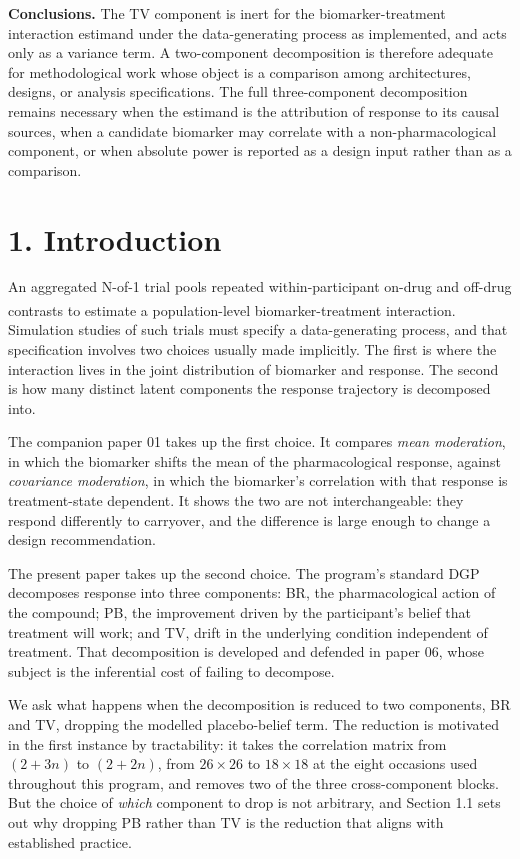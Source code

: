 \documentclass[
  11pt,
]{article}
\begin{document}
\textbf{Conclusions.} The TV component is inert for the
biomarker-treatment interaction estimand under the data-generating
process as implemented, and acts only as a variance term. A
two-component decomposition is therefore adequate for methodological
work whose object is a comparison among architectures, designs, or
analysis specifications. The full three-component decomposition
remains necessary when the estimand is the attribution of response to
its causal sources, when a candidate biomarker may correlate with a
non-pharmacological component, or when absolute power is reported as
a design input rather than as a comparison.

\section{1. Introduction}

An aggregated N-of-1 trial pools repeated within-participant on-drug
and off-drug contrasts to estimate a population-level
biomarker-treatment interaction\textsuperscript{}. Simulation
studies of such trials must specify a data-generating process, and
that specification involves two choices usually made implicitly. The
first is where the interaction lives in the joint distribution of
biomarker and response. The second is how many distinct latent
components the response trajectory is decomposed into.

The companion paper 01 takes up the first choice. It compares
\emph{mean moderation}, in which the biomarker shifts the mean of the
pharmacological response, against \emph{covariance moderation}, in
which the biomarker's correlation with that response is
treatment-state dependent. It shows the two are not interchangeable:
they respond differently to carryover, and the difference is large
enough to change a design recommendation.

The present paper takes up the second choice. The program's standard
DGP decomposes response into three components: BR, the
pharmacological action of the compound; PB, the improvement driven by
the participant's belief that treatment will work; and TV, drift in
the underlying condition independent of treatment. That decomposition
is developed and defended in paper 06, whose subject is the
inferential cost of failing to decompose.

We ask what happens when the decomposition is reduced to two
components, BR and TV, dropping the modelled placebo-belief term. The
reduction is motivated in the first instance by tractability: it
takes the correlation matrix from \((2 + 3n)\) to \((2 + 2n)\), from \(26
\times 26\) to \(18 \times 18\) at the eight occasions used throughout
this program, and removes two of the three cross-component blocks.
But the choice of \emph{which} component to drop is not arbitrary,
and Section 1.1 sets out why dropping PB rather than TV is the
reduction that aligns with established practice.
\end{document}
